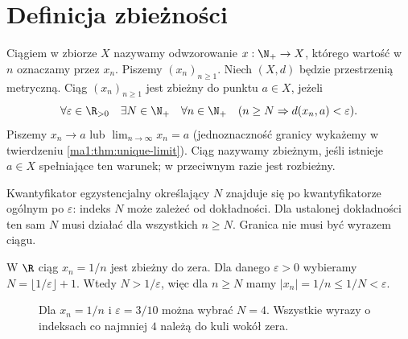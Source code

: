 \section{Definicja zbieżności}
\begin{definicja}
\label{ma1:def:sequence-convergence}
Ciągiem w zbiorze $X$ nazywamy odwzorowanie $x:\N_+\to X$, którego wartość w $n$ oznaczamy przez $x_n$. Piszemy $(x_n)_{n\ge1}$. Niech $(X,d)$ będzie przestrzenią metryczną. Ciąg $(x_n)_{n\ge1}$ jest zbieżny do punktu $a\in X$, jeżeli
\[
 \forall\varepsilon\in\R_{>0}\quad\exists N\in\N_+\quad
 \forall n\in\N_+\quad(n\ge N\Rightarrow d(x_n,a)<\varepsilon).
\]
Piszemy $x_n\to a$ lub $\lim_{n\to\infty}x_n=a$ (jednoznaczność granicy wykażemy w twierdzeniu \ref{ma1:thm:unique-limit}). Ciąg nazywamy zbieżnym, jeśli istnieje $a\in X$ spełniające ten warunek; w przeciwnym razie jest rozbieżny.
\end{definicja}
Kwantyfikator egzystencjalny określający $N$ znajduje się po kwantyfikatorze ogólnym po $\varepsilon$: indeks $N$ może zależeć od dokładności. Dla ustalonej dokładności ten sam $N$ musi działać dla wszystkich $n\ge N$. Granica nie musi być wyrazem ciągu.

\begin{przyklad}
\label{ma1:ex:inverse-sequence}
W $\R$ ciąg $x_n=1/n$ jest zbieżny do zera. Dla danego $\varepsilon>0$ wybieramy $N=\lfloor1/\varepsilon\rfloor+1$. Wtedy $N>1/\varepsilon$, więc dla $n\ge N$ mamy $|x_n|=1/n\le1/N<\varepsilon$.
\end{przyklad}

\begin{figure}[htbp]
\centering
{}
\caption{Dla $x_n=1/n$ i $\varepsilon=3/10$ można wybrać $N=4$. Wszystkie wyrazy o indeksach co najmniej $4$ należą do kuli wokół zera.}
\label{ma1:fig:epsilon-sequence}
\end{figure}
\FloatBarrier

